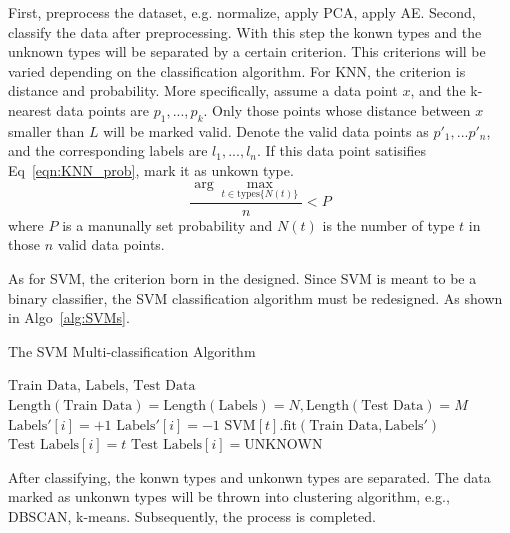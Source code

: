 \documentclass[twocolumn,10pt]{article}
\begin{document}
  First, preprocess the dataset, e.g. normalize, apply PCA, apply AE. Second, classify the data after preprocessing. 
  With this step the konwn types and the unknown types will be separated by a certain criterion. This criterions will 
  be varied depending on the classification algorithm. For KNN, the criterion is distance and probability. More specifically, 
  assume a data point $x$, and the k-nearest data points are $p_1,...,p_k$. Only those points whose distance between 
  $x$ smaller than $L$ will be marked valid. Denote the valid data points as $p'_1,...p'_n$, and the corresponding 
  labels are $l_1,...,l_n$. If this data point satisifies Eq~\ref{eqn:KNN_prob}, mark it as unkown type.
  \begin{equation}
    \label{eqn:KNN_prob}
    \frac{\arg\max_{t\in\text{types}\{N(t)\}}}{n}<P
  \end{equation}
  where $P$ is a manunally set probability and $N(t)$ is the number of type $t$ in those $n$ valid data points.
  
  As for SVM, the criterion born in the designed. Since SVM is meant to be a binary classifier, the SVM classification 
  algorithm must be redesigned. As shown in Algo~\ref{alg:SVMs}. 
  \begin{algorithm}[h]
    \caption{The SVM Multi-classification Algorithm}\label{alg:SVMs}
    \begin{algorithmic}[1]
      \Require $\text{Train Data, Labels, Test Data}$
      \Assume $\text{Length}(\text{Train Data})=\text{Length}(\text{Labels})=N,\text{Length}(\text{Test Data})=M$
            \State $\text{Labels}'[i] = +1$
          \Else
            \State $\text{Labels}'[i] = -1$
          \EndIf
        \EndFor
        \State $\text{SVM}[t].\text{fit}(\text{Train Data}, \text{Labels}')$
      \EndFor
            \State $\text{Test Labels}[i] = t$
          \Else
            \State $\text{Test Labels}[i] = \text{UNKNOWN}$
          \EndIf
        \EndFor
      \EndFor
    \end{algorithmic}
  \end{algorithm}

  After classifying, the konwn types and unkonwn types are separated. The data marked as unkonwn types will be thrown 
  into clustering algorithm, e.g., DBSCAN, k-means. Subsequently, the process is completed.
\end{document}
